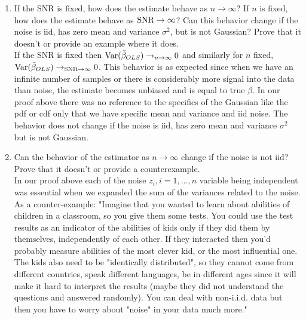 \documentclass[12pt,twoside]{article}
\begin{document}
\begin{enumerate}
\begin{enumerate}
  \item If the SNR is fixed, how does the estimate behave as $n \rightarrow \infty$? If $n$ is fixed, how does the estimate behave as $\operatorname{SNR} \rightarrow \infty$? Can this behavior change if the noise is iid, has zero mean and variance $\sigma^2$, but is not Gaussian? Prove that it doesn't or provide an example where it does.\\
  
  \medskip
If the SNR is fixed then $\mathrm{Var}{(\tilde{ \beta }_{OLS})} \rightarrow_{n \rightarrow \infty} 0$ and similarly for $n$ fixed, $\mathrm{Var}{(\tilde{ \beta }_{OLS})} \rightarrow_{\operatorname{SNR}\rightarrow \infty} 0$. This behavior is as expected since when we have an infinite number of samples or there is considerably more signal into the data than noise, the estimate becomes unbiased and is equal to true $\beta$. 
	In our proof above there was no reference to the specifics of the Gaussian like the pdf or cdf only that we have specific mean and variance and iid noise.
	The behavior does not change if the noise is iid, has zero mean and variance $\sigma^2$ but is not Gaussian.
  \medskip

  \item Can the behavior of the estimator as $n \rightarrow \infty$ change if the noise is not iid? Prove that it doesn't or provide a counterexample.\\
  
  \medskip
  In our proof above each of the noise $z_i, i=1, \ldots, n$ variable being independent was essential when we expanded the sum of the variances related to the noise.
   As a counter-example:
  "Imagine that you wanted to learn about abilities of children in a classroom, so you give them some tests. 
  You could use the test results as an indicator of the abilities of kids only if they did them by themselves, independently of each other. 
  If they interacted then you'd probably measure abilities of the most clever kid, or the most influential one.
  The kids also need to be "identically distributed", so they cannot come from different countries, speak different languages, be in different ages since it will make it hard to interpret the results
   (maybe they did not understand the questions and answered randomly). You can deal with non-i.i.d. data but then you have to worry about "noise" in your data much more."

  
  
  \end{enumerate} 
   
 \newpage
 

\end{enumerate}
\end{document}
